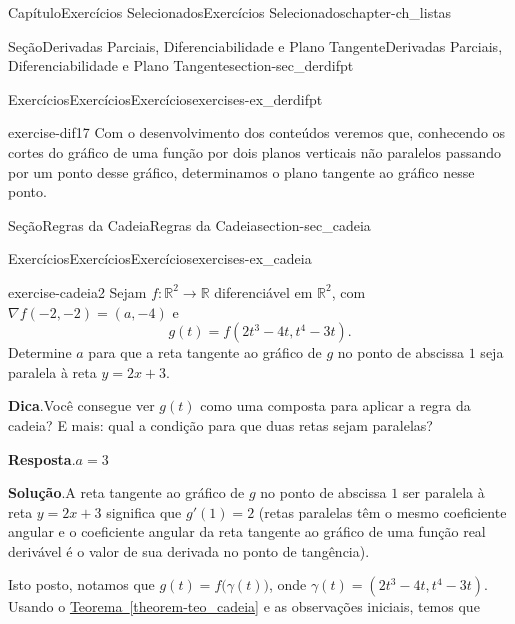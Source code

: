 \documentclass[oneside,10pt,]{book}
\newcommand{\blocktitlefont}{\relax}
\newcommand{\xreffont}{\relax}
\numberwithin{equation}{section}
\newcommand{\R}{\mathbb R}
\begin{document}
\begin{chapterptx}{Capítulo}{Exercícios Selecionados}{}{Exercícios Selecionados}{}{}{chapter-ch_listas}
\begin{sectionptx}{Seção}{Derivadas Parciais, Diferenciabilidade e Plano Tangente}{}{Derivadas Parciais, Diferenciabilidade e Plano Tangente}{}{}{section-sec_derdifpt}
\begin{exercises-subsection-numberless}{Exercícios}{Exercícios}{}{Exercícios}{}{}{exercises-ex_derdifpt}
\begin{divisionexercise}{17}{}{}{exercise-dif17}
Com o desenvolvimento dos conteúdos veremos que, conhecendo os cortes do gráfico de uma função por dois planos verticais não paralelos passando por um ponto desse gráfico, determinamos o plano tangente ao gráfico nesse ponto.%
\end{divisionexercise}%
\end{exercises-subsection-numberless}
\end{sectionptx}
%
%
\typeout{************************************************}
\typeout{************************************************}
%
\begin{sectionptx}{Seção}{Regras da Cadeia}{}{Regras da Cadeia}{}{}{section-sec_cadeia}
%
%
\typeout{************************************************}
\typeout{************************************************}
%
\begin{exercises-subsection-numberless}{Exercícios}{Exercícios}{}{Exercícios}{}{}{exercises-ex_cadeia}
\begin{divisionexercise}{2}{}{}{exercise-cadeia2}%
Sejam \(f\colon\mathbb R^2\to\R\) diferenciável em \(\R^2\), com \(\nabla f(-2,-2)=(a,-4)\) e%
\begin{equation*}
g(t)=f(2t^3-4t, t^4-3t).
\end{equation*}
Determine \(a\) para que a reta tangente ao gráfico de \(g\) no ponto de abscissa \(1\) seja paralela à reta \(y=2x+3\).%
\par\smallskip%
\noindent\textbf{\blocktitlefont Dica}.\hypertarget{hint-cadeia2-b}{}\quad{}Você consegue ver \(g(t)\) como uma composta para aplicar a regra da cadeia? E mais: qual a condição para que duas retas sejam paralelas?%
\par\smallskip%
\noindent\textbf{\blocktitlefont Resposta}.\hypertarget{answer-cadeia2-c}{}\quad{}\(a=3\)%
\par\smallskip%
\noindent\textbf{\blocktitlefont Solução}.\hypertarget{solution-cadeia2-d}{}\quad{}A reta tangente ao gráfico de \(g\) no ponto de abscissa \(1\) ser paralela à reta \(y=2x+3\) significa que \(g'(1)=2\) (retas paralelas têm o mesmo coeficiente angular e o coeficiente angular da reta tangente ao gráfico de uma função real derivável é o valor de sua derivada no ponto de tangência).%
\par
Isto posto, notamos que \(g(t)=f\big(\gamma(t)\big)\), onde \(\gamma(t)=(2t^3-4t, t^4-3t)\). Usando o \hyperref[theorem-teo_cadeia]{Teorema~{\xreffont\ref{theorem-teo_cadeia}}} e as observações iniciais, temos que%
\begin{equation*}

\end{equation*}
\end{divisionexercise}
\end{exercises-subsection-numberless}
\end{sectionptx}
\end{chapterptx}
\end{document}
